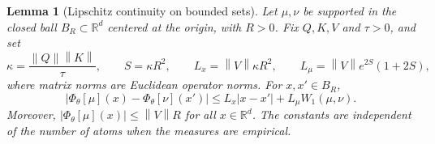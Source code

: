 \documentclass[11pt]{amsart}
\numberwithin{equation}{section}
\theoremstyle{plain}
\newtheorem{lemma}[theorem]{Lemma}
\newcommand{\R}{\mathbb{R}}
\newcommand{\abs}[1]{\left\lvert#1\right\rvert}
\newcommand{\norm}[1]{\left\lVert#1\right\rVert}
\begin{document}
\begin{lemma}[Lipschitz continuity on bounded sets]\label{lem:attention-lipschitz}
Let $\mu,\nu$ be supported in the closed ball $B_R\subset\R^d$ centered at
the origin, with $R>0$.  Fix $Q,K,V$ and $\tau>0$, and set
\[
 \kappa=\frac{\norm Q\norm K}{\tau},\qquad S=\kappa R^2,
 \qquad
 L_x=\norm V\kappa R^2,\qquad
 L_\mu=\norm V e^{2S}(1+2S),
\]
where matrix norms are Euclidean operator norms.  For $x,x'\in B_R$,
\begin{equation}\label{eq:attn-lip}
 \abs{\Phi_\theta[\mu](x)-\Phi_\theta[\nu](x')}
 \leq L_x\abs{x-x'}+L_\mu W_1(\mu,\nu).
\end{equation}
Moreover, $\abs{\Phi_\theta[\mu](x)}\leq\norm V R$ for all $x\in\R^d$.
The constants are independent of the number of atoms when the measures are
empirical.
\end{lemma}
\end{document}
